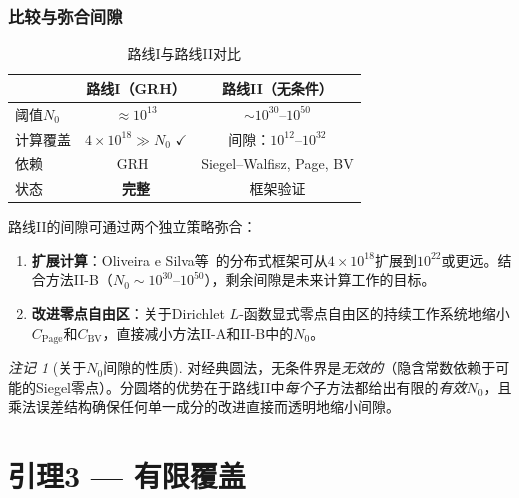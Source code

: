 \documentclass[11pt,a4paper]{article}
\theoremstyle{remark}
\newtheorem{remark}[theorem]{注记}
\begin{document}
\subsubsection{比较与弥合间隙}

\begin{table}[ht]
\centering
\caption{路线I与路线II对比}
\label{tab:route-comparison}
\small
\renewcommand{\arraystretch}{1.3}
\begin{tabular}{@{}lcc@{}}
\toprule
 & \textbf{路线I（GRH）} & \textbf{路线II（无条件）} \\
\midrule
阈值$N_0$ & $\approx 10^{13}$ & $\sim 10^{30}$--$10^{50}$ \\
计算覆盖 & $4\times 10^{18} \gg N_0$ \quad$\checkmark$ & 间隙：$10^{12}$--$10^{32}$ \\
依赖 & GRH~\cite{Chen2026GRH} & Siegel--Walfisz, Page, BV \\
状态 & \textbf{完整} & 框架验证 \\
\bottomrule
\end{tabular}
\end{table}

路线II的间隙可通过两个独立策略弥合：
\begin{enumerate}[nosep]
  \item \textbf{扩展计算}：Oliveira e Silva等~\cite{OSP2014}的分布式框架可从$4\times 10^{18}$扩展到$10^{22}$或更远。结合方法II-B（$N_0 \sim 10^{30}$--$10^{50}$），剩余间隙是未来计算工作的目标。

  \item \textbf{改进零点自由区}：关于Dirichlet $L$-函数显式零点自由区的持续工作系统地缩小$C_{\text{Page}}$和$C_{\text{BV}}$，直接减小方法II-A和II-B中的$N_0$。
\end{enumerate}

\begin{remark}[关于$N_0$间隙的性质]
对经典圆法，无条件界是\emph{无效的}（隐含常数依赖于可能的Siegel零点）。分圆塔的优势在于路线II中\emph{每个}子方法都给出有限的\emph{有效}$N_0$，且乘法误差结构确保任何单一成分的改进直接而透明地缩小间隙。
\end{remark}

\section{引理3 --- 有限覆盖}
\label{sec:finite}
\end{document}
